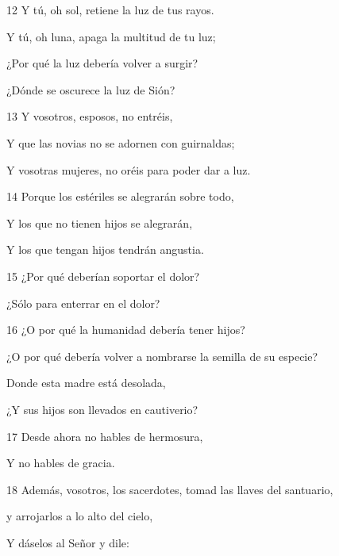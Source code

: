 \par 12 Y tú, oh sol, retiene la luz de tus rayos.

\par Y tú, oh luna, apaga la multitud de tu luz;

\par ¿Por qué la luz debería volver a surgir?

\par ¿Dónde se oscurece la luz de Sión?

\par 13 Y vosotros, esposos, no entréis,

\par Y que las novias no se adornen con guirnaldas;

\par Y vosotras mujeres, no oréis para poder dar a luz.

\par 14 Porque los estériles se alegrarán sobre todo,

\par Y los que no tienen hijos se alegrarán,

\par Y los que tengan hijos tendrán angustia.

\par 15 ¿Por qué deberían soportar el dolor?

\par ¿Sólo para enterrar en el dolor?

\par 16 ¿O por qué la humanidad debería tener hijos?

\par ¿O por qué debería volver a nombrarse la semilla de su especie?

\par Donde esta madre está desolada,

\par ¿Y sus hijos son llevados en cautiverio?

\par 17 Desde ahora no hables de hermosura,

\par Y no hables de gracia.

\par 18 Además, vosotros, los sacerdotes, tomad las llaves del santuario,

\par y arrojarlos a lo alto del cielo,

\par Y dáselos al Señor y dile:

